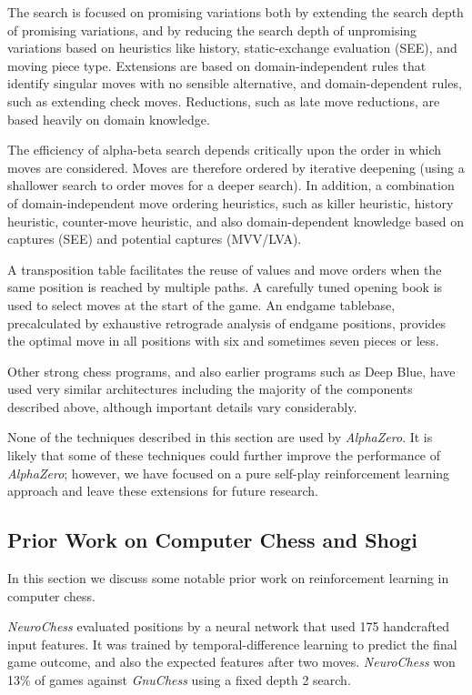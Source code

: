 \documentclass[12pt]{article}
\begin{document}
The search is focused on promising variations both by extending the search depth of promising variations, and by reducing the search depth of unpromising variations based on heuristics like history, static-exchange evaluation (SEE), and moving piece type. Extensions are based on domain-independent rules that identify singular moves with no sensible alternative, and domain-dependent rules, such as extending check moves. Reductions, such as late move reductions, are based heavily on domain knowledge.

The efficiency of alpha-beta search depends critically upon the order in which moves are considered. Moves are therefore ordered by iterative deepening (using a shallower search to order moves for a deeper search). In addition, a combination of domain-independent move ordering heuristics, such as killer heuristic, history heuristic, counter-move heuristic, and also domain-dependent knowledge based on captures (SEE) and potential captures (MVV/LVA).

A transposition table facilitates the reuse of values and move orders when the same position is reached by multiple paths. A carefully tuned opening book is used to select moves at the start of the game. An endgame tablebase, precalculated by exhaustive retrograde analysis of endgame positions, provides the optimal move in all positions with six and sometimes seven pieces or less.

Other strong chess programs, and also earlier programs such as Deep Blue, have used very similar architectures \cite{Marsland87,Campbell02DeepBlue} including the majority of the components described above, although important details vary considerably. 

None of the techniques described in this section are used by \emph{AlphaZero}. It is likely that some of these techniques could further improve the performance of \emph{AlphaZero}; however, we have focused on a pure self-play reinforcement learning approach and leave these extensions for future research.

\subsection*{Prior Work on Computer Chess and Shogi}

In this section we discuss some notable prior work on reinforcement learning in computer chess. 

\emph{NeuroChess} \cite{thrun:neurochess} evaluated positions by a neural network that used 175 handcrafted input features. It was trained by temporal-difference learning to predict the final game outcome, and also the expected features after two moves. \emph{NeuroChess} won 13\% of games against \emph{GnuChess} using a fixed depth 2 search. 
\end{document}
